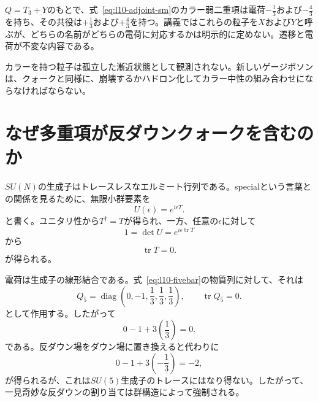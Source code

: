\(Q=T_3+Y\)のもとで、式~\eqref{eq:l10-adjoint-sm}のカラー弱二重項は電荷\(-\tfrac13\)および\(-\tfrac43\)を持ち、その共役は\(+\tfrac13\)および\(+\tfrac43\)を持つ。講義ではこれらの粒子を\(X\)および\(Y\)と呼ぶが、どちらの名前がどちらの電荷に対応するかは明示的に定めない。遷移と電荷が不変な内容である。

\begin{classroomqa}
\end{classroomqa}

カラーを持つ粒子は孤立した漸近状態として観測されない。新しいゲージボソンは、クォークと同様に、崩壊するかハドロン化してカラー中性の組み合わせにならなければならない。

\section{なぜ多重項が反ダウンクォークを含むのか}

\(SU(N)\)の生成子はトレースレスなエルミート行列である。specialという言葉との関係を見るために、無限小群要素を
\begin{equation}
U(\epsilon)=e^{i\epsilon T}.
\end{equation}
と書く。ユニタリ性から\(T^\dagger=T\)が得られ、一方、任意の\(\epsilon\)に対して
\begin{equation}
1=\det U=e^{i\epsilon\operatorname{tr}T}
\end{equation}
から
\begin{equation}
\operatorname{tr}T=0.
\label{eq:l10-traceless-generator}
\end{equation}
が得られる。

電荷は生成子の線形結合である。式~\eqref{eq:l10-fivebar}の物質列に対して、それは
\begin{equation}
Q_{\overline5}
=
\operatorname{diag}
\left(0,-1,\frac13,\frac13,\frac13\right),
\qquad
\operatorname{tr}Q_{\overline5}=0.
\label{eq:l10-charge-fivebar}
\end{equation}
として作用する。したがって
\begin{equation}
0-1+3\left(\frac13\right)=0.
\end{equation}
である。反ダウン場をダウン場に置き換えると代わりに
\begin{equation}
0-1+3\left(-\frac13\right)=-2,
\end{equation}
が得られるが、これは\(SU(5)\)生成子のトレースにはなり得ない。したがって、一見奇妙な反ダウンの割り当ては群構造によって強制される。

